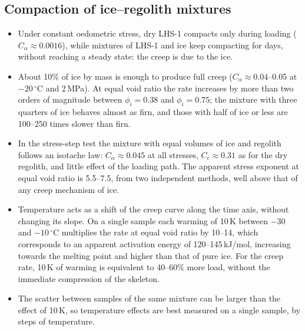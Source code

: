 \subsection{Compaction of ice--regolith mixtures}
\begin{itemize}
    \item Under constant oedometric stress, dry LHS-1 compacts only during loading ($C_\alpha\approx0.0016$), while mixtures of LHS-1 and ice keep compacting for days, without reaching a steady state: the creep is due to the ice.
    \item About 10\% of ice by mass is enough to produce full creep ($C_\alpha\approx0.04$--0.05 at $-20\,^\circ$C and 2\,MPa). At equal void ratio the rate increases by more than two orders of magnitude between $\phi_i = 0.38$ and $\phi_i = 0.75$; the mixture with three quarters of ice behaves almost as firn, and those with half of ice or less are 100--250 times slower than firn.
    \item In the stress-step test the mixture with equal volumes of ice and regolith follows an isotache law: $C_\alpha\approx0.045$ at all stresses, $C_c\approx0.31$ as for the dry regolith, and little effect of the loading path. The apparent stress exponent at equal void ratio is 5.5--7.5, from two independent methods, well above that of any creep mechanism of ice.
    \item Temperature acts as a shift of the creep curve along the time axis, without changing its slope. On a single sample each warming of 10\,K between $-30$ and $-10\,^\circ$C multiplies the rate at equal void ratio by 10--14, which corresponds to an apparent activation energy of 120--145\,kJ/mol, increasing towards the melting point and higher than that of pure ice. For the creep rate, 10\,K of warming is equivalent to 40--60\% more load, without the immediate compression of the skeleton.
    \item The scatter between samples of the same mixture can be larger than the effect of 10\,K, so temperature effects are best measured on a single sample, by steps of temperature.
\end{itemize}

